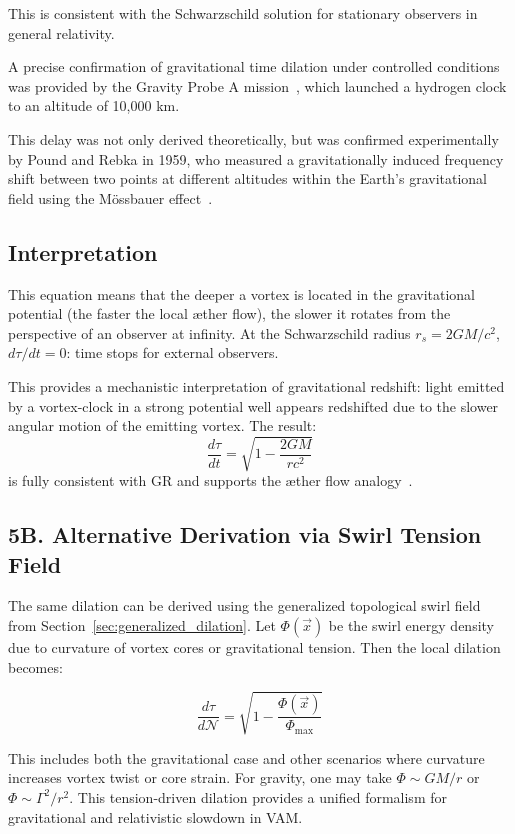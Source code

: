 This is consistent with the Schwarzschild solution for stationary observers in general relativity.

A precise confirmation of gravitational time dilation under controlled conditions was provided by the Gravity Probe A mission~\cite{vessot_levine_1980}, which launched a hydrogen clock to an altitude of 10,000 km.

This delay was not only derived theoretically, but was confirmed experimentally by Pound and Rebka in 1959, who measured a gravitationally induced frequency shift between two points at different altitudes within the Earth's gravitational field using the Mössbauer effect~\cite{pound_rebka_1959}.

\subsection*{Interpretation}

This equation means that the deeper a vortex is located in the gravitational potential (the faster the local æther flow), the slower it rotates from the perspective of an observer at infinity. At the Schwarzschild radius $r_s = 2GM/c^2$, $d\tau/dt = 0$: time stops for external observers.

This provides a mechanistic interpretation of gravitational redshift: light emitted by a vortex-clock in a strong potential well appears redshifted due to the slower angular motion of the emitting vortex. The result:
\[
\boxed{\frac{d\tau}{dt} = \sqrt{1 - \frac{2GM}{rc^2}}}
\]
is fully consistent with GR and supports the æther flow analogy~\cite{Schiller2022-maxforce}.

\subsection*{5B. Alternative Derivation via Swirl Tension Field}

The same dilation can be derived using the generalized topological swirl field from Section~\ref{sec:generalized_dilation}. Let $\Phi(\vec{x})$ be the swirl energy density due to curvature of vortex cores or gravitational tension. Then the local dilation becomes:

\[
\frac{d\tau}{d\mathcal{N}} = \sqrt{1 - \frac{\Phi(\vec{x})}{\Phi_{\text{max}}}}
\]

This includes both the gravitational case and other scenarios where curvature increases vortex twist or core strain. For gravity, one may take $\Phi \sim GM/r$ or $\Phi \sim \Gamma^2/r^2$. This tension-driven dilation provides a unified formalism for gravitational and relativistic slowdown in VAM.

